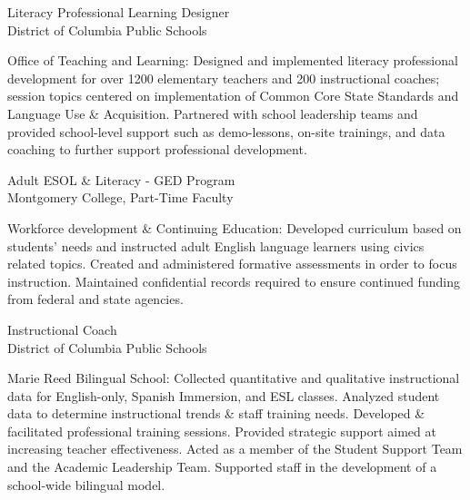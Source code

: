 \documentclass[]{scrartcl}
\begin{document}
\begin{cleanCV}
{Literacy Professional Learning Designer}
{\\District of Columbia Public Schools}

\JobDesc
{Office of Teaching and Learning:}
{ Designed and implemented literacy professional development for over 1200 elementary teachers and 200 instructional coaches; session topics centered on implementation of Common Core State Standards and Language Use \& Acquisition. Partnered with school leadership teams and provided school-level support such as demo-lessons, on-site trainings, and data coaching to further support professional development.}



{Adult ESOL \& Literacy - GED Program}
{\\Montgomery College, Part-Time Faculty}

\JobDesc
{Workforce development \& Continuing Education: }
{Developed curriculum based on students' needs and instructed adult English language learners using civics related topics. Created and administered formative assessments in order to focus instruction. Maintained confidential records required to ensure continued funding from federal and state agencies.}


{Instructional Coach}
{\\District of Columbia Public Schools}

\JobDesc
{Marie Reed Bilingual School:}
{ Collected quantitative and qualitative instructional data for English-only, Spanish Immersion, and ESL classes. Analyzed student data to determine instructional trends \& staff training needs. Developed \& facilitated professional training sessions. Provided strategic support aimed at increasing teacher effectiveness. Acted as a member of the  Student Support Team and the Academic Leadership Team. Supported staff in the development of a school-wide bilingual model.}





\end{cleanCV}
\end{document}
